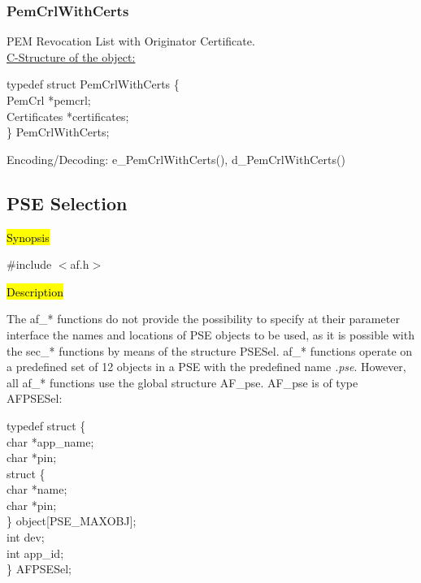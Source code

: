 \subsubsection{PemCrlWithCerts}
PEM Revocation List with Originator Certificate. \\
\underline{C-Structure of the object:}

{\small
\btab
\1      typedef struct PemCrlWithCerts \{ \\
\2              PemCrl  \2          *pemcrl; \\
\2              Certificates \2  *certificates; \\
\1       \} PemCrlWithCerts; \\
\etab
}

Encoding/Decoding: e\_PemCrlWithCerts(), d\_PemCrlWithCerts()



\subsection{PSE Selection}
\label{cc_sel}

\hl{Synopsis}

\#include $<$af.h$>$

\hl{Description}
     
The af\_* functions do not provide the possibility
to specify at their parameter interface the names and locations of
PSE objects to be used, as it is possible with the sec\_* functions by
means of the structure PSESel. af\_* functions operate on a predefined
set of 12 objects in a PSE with the predefined name {\em .pse}.
However, all af\_* functions use the global structure AF\_pse. AF\_pse is of
type AFPSESel:

{\small
\bvtab
\4 typedef struct \{ \\
\6        char \1    *app\_name; \\
\6        char \1    *pin; \\
\6        struct \{ \\
\8            char \1 *name; \\
\8            char \1 *pin; \\
\6        \}  \1      object[PSE\_MAXOBJ]; \\
\6        int \1     dev; \\
\6        int \1     app\_id; \\
\4 \} AFPSESel; 
\evtab
}

